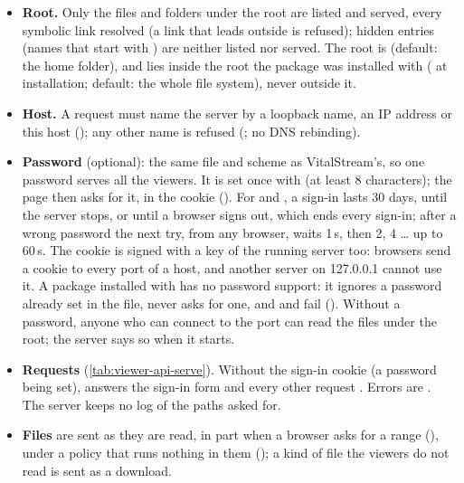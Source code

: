 \begin{itemize}
\item \textbf{Root.} Only the files and folders under the root are listed and served, every
  symbolic link resolved (a link that leads outside is refused); hidden entries (names that
  start with ) are neither listed nor served. The root is 
  (default: the home folder), and lies inside the root the package was installed with
  ( at installation; default: the whole file system), never outside it.
\item \textbf{Host.} A request must name the server by a loopback name, an IP address or this
  host (); any other name is refused (; no DNS rebinding).
\item \textbf{Password} (optional): the same file and scheme as VitalStream's, so one password
  serves all the viewers. It is set once with  (at least 8 characters);
  the page then asks for it, in the cookie 
  (). For  and , a sign-in lasts
  30 days, until the server stops, or until a browser signs out, which ends every sign-in; after
  a wrong password the next try, from any browser, waits 1\,s, then 2, 4 \dots{} up to 60\,s.
  The cookie is signed with a key of the running server too: browsers send a cookie to every
  port of a host, and another server on 127.0.0.1 cannot use it. A package installed with
   has no password support: it ignores a password already set in the
  file, never asks for one, and  and  fail
  (). Without a password, anyone who
  can connect to the port can read the files under the root; the server says so when it starts.
\item \textbf{Requests} (\cref{tab:viewer-api-serve}). Without the sign-in cookie (a password
  being set),  answers the sign-in form and every other request 
  . Errors are . The server
  keeps no log of the paths asked for.
\item \textbf{Files} are sent as they are read, in part when a browser asks for a range
  (), under a policy that runs nothing in them (); a kind of file the viewers do not read is sent as a download.
\end{itemize}


